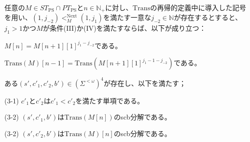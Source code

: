 \documentclass[dvipdfmx,uplatex]{jsarticle}
\theoremstyle{customnonumberbreakfortheorem}
\theoremstyle{customnonumberbreakforproof}
\begin{document}
\begin{lemma}\label{条件(III)か(IV)の下での基本列の基本性質}
	任意の\(M \in ST_{\textrm{PS}} \cap PT_{\textrm{PS}}\)と\(n \in \mathbb{N}_{+}\)に対し、\(\textrm{Trans}\)の再帰的定義中に導入した記号を用い、\((1,j_{-2}) <_M^{\textrm{Next}} (1,j_1)\)を満たす一意な\(j_{-2} \in \mathbb{N}\)が存在するとすると、\(j_1 > 1\)かつ\(M\)が条件(III)か(IV)を満たすならば\footnotemark{}、以下が成り立つ：
	\begin{penumerate}
		\item \(M[n] = M[n+1][1]^{j_1-j_{-2}}\)である。
		\item \(\textrm{Trans}(M)[n-1] = \textrm{Trans}(M[n+1][1]^{j_1-1-j_{-2}})\)である。
		\item ある\((s',c'_1,c'_2,b') \in (\Sigma^{< \omega})^4\)が存在し、以下を満たす；
		\begin{indented}
			\item[(3-1)] \(c'_1\)と\(c'_2\)は\(c'_1 < c'_2\)を満たす単項である。
			\item[(3-2)] \((s',c'_1,b')\)は\(\textrm{Trans}(M[n])\)のscb分解である。
			\item[(3-2)] \((s',c'_2,b')\)は\(\textrm{Trans}(M)[n]\)のscb分解である。
		\end{indented}
	\end{penumerate}
\end{lemma}
\end{document}
